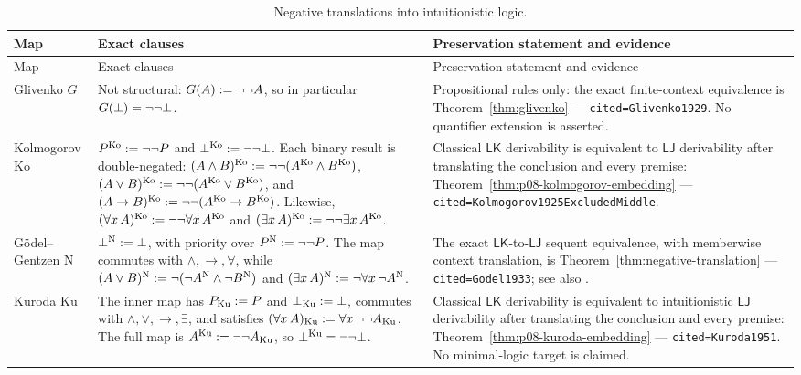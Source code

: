 \begin{landscape}
\begingroup\scriptsize\setlength{\tabcolsep}{3pt}
\begin{longtable}{@{}p{.75in}p{3.60in}p{2.85in}@{}}
\caption{Negative translations into intuitionistic logic.}
\label{tab:p08-negative-translations}\\
\toprule
Map & Exact clauses & Preservation statement and evidence \\
\midrule
\endfirsthead
\toprule
Map & Exact clauses & Preservation statement and evidence \\
\midrule
\endhead
Glivenko \(G\) &
Not structural: \(G(A)\mathrel{:=}\neg\neg A\), so in particular
\(G(\bot)=\neg\neg\bot\). &
Propositional rules only: the exact finite-context equivalence is
Theorem~\ref{thm:glivenko} --- \texttt{cited=Glivenko1929}.  No
quantifier extension is asserted. \\
\addlinespace
Kolmogorov \(\mathrm{Ko}\) &
\(P^{\mathrm{Ko}}\mathrel{:=}\neg\neg P\) and
\(\bot^{\mathrm{Ko}}\mathrel{:=}\neg\neg\bot\).  Each binary result is
double-negated:
\((A\land B)^{\mathrm{Ko}}\mathrel{:=}
\neg\neg(A^{\mathrm{Ko}}\land B^{\mathrm{Ko}})\),
\((A\lor B)^{\mathrm{Ko}}\mathrel{:=}
\neg\neg(A^{\mathrm{Ko}}\lor B^{\mathrm{Ko}})\), and
\((A\to B)^{\mathrm{Ko}}\mathrel{:=}
\neg\neg(A^{\mathrm{Ko}}\to B^{\mathrm{Ko}})\).  Likewise,
\((\forall x\,A)^{\mathrm{Ko}}\mathrel{:=}
\neg\neg\forall x\,A^{\mathrm{Ko}}\) and
\((\exists x\,A)^{\mathrm{Ko}}\mathrel{:=}
\neg\neg\exists x\,A^{\mathrm{Ko}}\). &
Classical \(\mathsf{LK}\) derivability is equivalent to
\(\mathsf{LJ}\) derivability after translating the conclusion and every
premise: Theorem~\ref{thm:p08-kolmogorov-embedding} ---
\texttt{cited=Kolmogorov1925ExcludedMiddle}. \\
\addlinespace
G\"odel--Gentzen \(\mathrm N\) &
\(\bot^{\mathrm N}\mathrel{:=}\bot\), with priority over
\(P^{\mathrm N}\mathrel{:=}\neg\neg P\).  The map commutes with
\(\land,\to,\forall\), while
\((A\lor B)^{\mathrm N}\mathrel{:=}
\neg(\neg A^{\mathrm N}\land\neg B^{\mathrm N})\) and
\((\exists x\,A)^{\mathrm N}\mathrel{:=}
\neg\forall x\,\neg A^{\mathrm N}\). &
The exact \(\mathsf{LK}\)-to-\(\mathsf{LJ}\) sequent equivalence, with
memberwise context translation, is Theorem~\ref{thm:negative-translation} ---
\texttt{cited=Godel1933}; see also \cite{Gentzen1936}. \\
\addlinespace
Kuroda \(\mathrm{Ku}\) &
The inner map has \(P_{\mathrm{Ku}}\mathrel{:=} P\) and
\(\bot_{\mathrm{Ku}}\mathrel{:=}\bot\), commutes with
\(\land,\lor,\to,\exists\), and satisfies
\((\forall x\,A)_{\mathrm{Ku}}\mathrel{:=}
\forall x\,\neg\neg A_{\mathrm{Ku}}\).  The full map is
\(A^{\mathrm{Ku}}\mathrel{:=}\neg\neg A_{\mathrm{Ku}}\), so
\(\bot^{\mathrm{Ku}}=\neg\neg\bot\). &
Classical \(\mathsf{LK}\) derivability is equivalent to intuitionistic
\(\mathsf{LJ}\) derivability after translating the conclusion and every
premise: Theorem~\ref{thm:p08-kuroda-embedding} ---
\texttt{cited=Kuroda1951}.  No minimal-logic target is claimed. \\
\bottomrule
\end{longtable}
\endgroup
\end{landscape}


